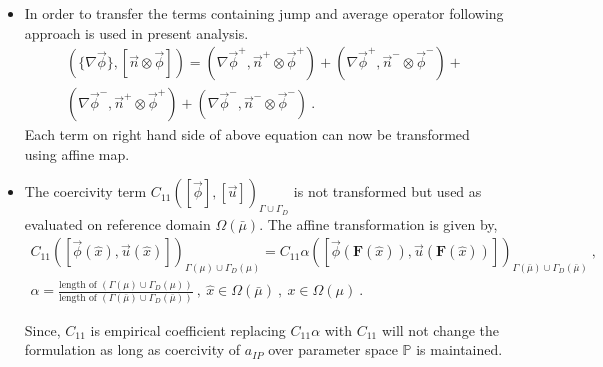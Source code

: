 \documentclass[graybox]{svmult}
\begin{document}
\begin{itemize}
\item In order to transfer the terms containing jump and average operator following approach is used in present analysis.
\begin{equation*}\label{jump_average_term_split}
\begin{split}
\left(\lbrace \nabla \overrightarrow{\phi} \rbrace , \left[ \overrightarrow{n} \otimes \overrightarrow{\phi}  \right]  \right) = \left( \nabla \overrightarrow{\phi}^+ , \overrightarrow{n}^+ \otimes \overrightarrow{\phi}^+ \right) + \left( \nabla \overrightarrow{\phi}^+ , \overrightarrow{n}^- \otimes \overrightarrow{\phi}^- \right) + \\ 
\left( \nabla \overrightarrow{\phi}^- , \overrightarrow{n}^+ \otimes \overrightarrow{\phi}^+ \right) + \left( \nabla \overrightarrow{\phi}^- , \overrightarrow{n}^- \otimes \overrightarrow{\phi}^- \right) \ .
\end{split}
\end{equation*}
Each term on right hand side of above equation can now be transformed using affine map.

\item The coercivity term $C_{11}\left( [\overrightarrow{\phi}],[\overrightarrow{u}] \right)_{\Gamma \cup \Gamma_D}$ is not transformed but used as evaluated on reference domain $\Omega(\bar{\mu})$. The affine transformation is given by,
\begin{equation*}
\begin{split}
C_{11}\left( [\overrightarrow{\phi}(\hat{x}),\overrightarrow{u}(\hat{x})] \right)_{\Gamma(\mu) \cup \Gamma_D(\mu)} = C_{11} \alpha \left( [\overrightarrow{\phi}(\bm{F}(\hat{x})),\overrightarrow{u}(\bm{F}(\hat{x}))] \right)_{\Gamma(\bar{\mu}) \cup \Gamma_D(\bar{\mu})} \ , \\
\alpha = \frac{\text{length of }\left( \Gamma(\mu) \cup \Gamma_D(\mu)\right)}{\text{length of }\left( \Gamma(\bar{\mu}) \cup \Gamma_D(\bar{\mu})\right)} \ , \ \hat{x} \in \Omega(\bar{\mu}) \ , \ x \in \Omega(\mu) \ .
\end{split}
\end{equation*}

Since, $C_{11}$ is empirical coefficient replacing $C_{11} \alpha$ with $C_{11}$ will not change the formulation as long as coercivity of $a_{IP}$ over parameter space $\mathbb{P}$ is maintained. 
\end{itemize}
\end{document}
